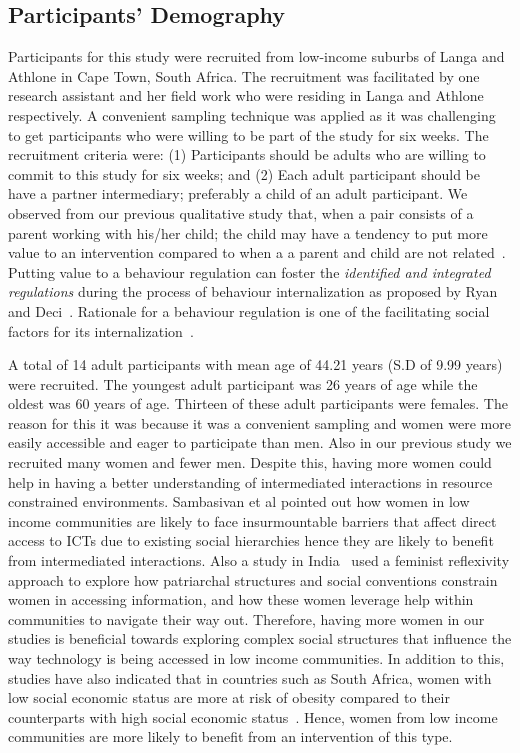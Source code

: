 \documentclass{sig-alternate}
\begin{document}
\subsection{Participants' Demography}
Participants for this study were recruited from low-income suburbs of Langa and Athlone in Cape Town, South Africa. The recruitment was facilitated by one research assistant and her field work who were residing in Langa and Athlone respectively. A convenient sampling technique was applied as it was challenging to get participants who were willing to be part of the study for six weeks.  The recruitment criteria were: (1) Participants should be adults who are willing to commit to this study for six weeks; and (2) Each adult participant should be have a partner intermediary; preferably a child of an adult participant. We observed from our previous qualitative study that, when a pair consists of a parent working with his/her child; the child may have a tendency to put more value to an intervention compared to when a a parent and child are not related~\cite{katule2016:leveraging}. Putting value to a behaviour regulation can foster the \emph{identified and integrated regulations} during the process of behaviour internalization as proposed by Ryan and Deci~\cite{ryan2000intrinsic}. Rationale for a behaviour regulation is one of the facilitating social factors for  its internalization~\cite{deci1994facilitating}. 

A total of 14 adult participants with mean age of 44.21 years (S.D of 9.99 years) were recruited.  The youngest adult participant was 26 years of age while the oldest was 60 years of age. Thirteen of these adult participants were females. The reason for this it was because it was a convenient sampling and women were more easily accessible and eager to participate than men.  Also in our previous study\cite{katule2016:leveraging} we recruited many women and fewer men. Despite this, having more women could help in having a better understanding of intermediated interactions in resource constrained environments. Sambasivan et al\cite{sambasivan2010} pointed out how women in low income communities are likely to face insurmountable barriers that affect direct access to ICTs due to existing social hierarchies hence they are likely to benefit from intermediated interactions. Also a study in India~\cite{kumar2015mobile} used a feminist reflexivity approach to explore how patriarchal structures and social conventions constrain women in accessing information, and how these women leverage help within communities to navigate their way out. Therefore, having more women in our studies is beneficial towards exploring complex social structures that influence the way technology is being accessed in low income communities. In addition to this, studies have also indicated  that in countries such as South Africa, women with low social economic status are more at risk of obesity compared to their counterparts with high social economic status~\cite{katule2016:leveraging}. Hence, women from  low income communities are more likely to benefit from an intervention of this type.  
\end{document}
